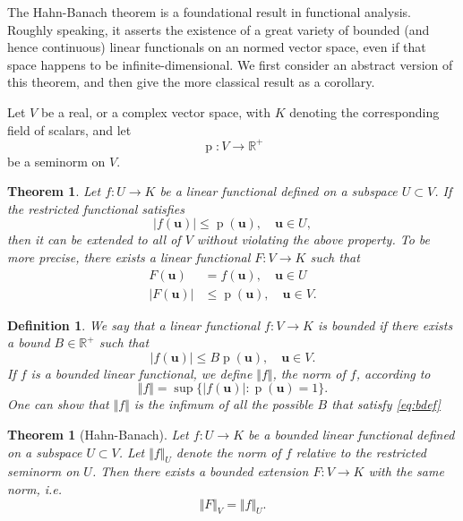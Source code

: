 \documentclass[12pt]{article}
\newcommand{\reals}{\mathbb{R}}
\newtheorem{definition}[proposition]{Definition}
\newtheorem{theorem}[proposition]{Theorem}
\newcommand{\bu}{\mathbf{u}}
\newcommand{\pnorm}{\operatorname{p}}
\newcommand{\snorm}[1]{\pnorm(#1)}
\begin{document}
The Hahn-Banach theorem is a foundational result in functional
analysis.  Roughly speaking, it asserts the existence of a great
variety of bounded (and hence continuous) linear functionals on an
normed vector space, even if that space happens to be
infinite-dimensional. We first consider an
abstract version of this theorem, and then give the more classical
result as a corollary.

Let $V$ be a real, or a complex vector space, with $K$
denoting the corresponding field of scalars, and let
$$\pnorm:V\rightarrow\reals^+$$ 
be a seminorm on $V$.

\begin{theorem}
  Let $f:U\to K$ be a linear functional defined on a subspace
  $U\subset V$.  If the restricted functional satisfies
  $$\vert f(\bu)\vert\leq \snorm{\bu},\quad \bu\in U,$$
  then it can be extended to all of $V$ without violating the above
  property.  To be more precise, there exists a linear functional
  $F:V\to K$ such that
  \begin{align*}
    F(\bu) &= f(\bu),\quad \bu\in U\\
    \vert F(\bu) \vert &\leq \snorm{\bu},\quad \bu\in V.
  \end{align*}  
\end{theorem}

\begin{definition}
  We say that a linear functional $f:V\to K$ is \emph{bounded} if 
  there exists a bound $B\in\reals^+$ such that
  \begin{equation}
    \label{eq:bdef}
    \vert f(\bu)\vert \leq B \snorm{\bu},\quad \bu\in V.    
  \end{equation}
  If $f$ is a bounded linear functional, we define $\Vert f\Vert$, the
  norm of $f$, according to
  $$\Vert f \Vert = \sup \{ \vert f(\bu)\vert : \snorm{\bu} = 1 \}.$$
  One can show that $\Vert f\Vert$ is the infimum of all the possible
  $B$ that satisfy \eqref{eq:bdef}
\end{definition}

\begin{theorem}[Hahn-Banach]
  Let $f:U\to K$ be a bounded linear functional defined on a subspace
  $U\subset V$. Let $\Vert f \Vert_U$ denote the norm of $f$ relative
  to the restricted seminorm on $U$.  Then there exists a bounded
  extension $F:V\to K$ with the same norm, i.e.
  $$\Vert F\Vert_V = \Vert f\Vert_U.$$
\end{theorem}
\end{document}
